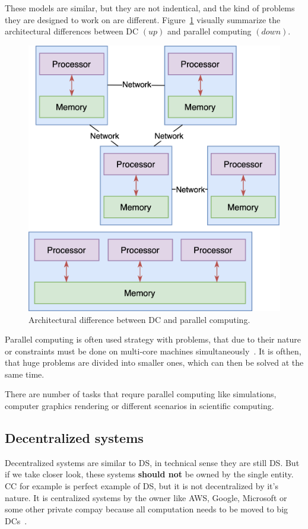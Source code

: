 These models are similar, but they are not indentical, and the kind of problems they are designed to work on are different. Figure~\ref{fig:fig4} visually summarize the architectural  differences between DC $(up)$ and parallel computing $(down)$.

\begin{figure}[H]
	\begin{center}
		\includegraphics[scale=0.8]{images/Figure4.png}
	\end{center}
	\vspace{-0.6cm}
	\caption{Architectural difference between DC and parallel computing.}
	\label{fig:fig4}
\end{figure}

Parallel computing is often used strategy with problems, that due to their nature or constraints must be done on multi-core machines simultaneously~\cite{0072397}. It is ofthen, that huge problems are divided into smaller ones, which can then be solved at the same time. 

There are number of tasks that requre parallel computing like simulations, computer graphics rendering or different scenarios in scientific computing.
%
%
\subsection{Decentralized systems}\label{sec:decentralized_systems}
%
Decentralized systems are similar to DS, in technical sense they are still DS. But if we take closer look, these systems \textbf{should not} be owned by the single entity. CC for example is perfect example of DS, but it is not decentralized by it's nature. It is centralized systems by the owner like AWS, Google, Microsoft or some other private compay because all computation needs to be moved to big DCs~\cite{HossainRH18}.

